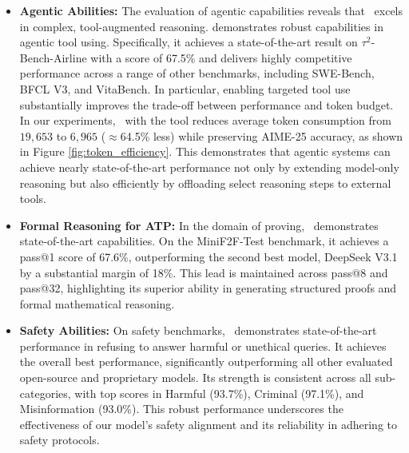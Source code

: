 \begin{itemize}
    \item\textbf{Agentic Abilities: }The evaluation of agentic capabilities reveals that~{\longcatthink} excels in complex, tool-augmented reasoning. 
    demonstrates robust capabilities in agentic tool using. Specifically, it achieves a state-of-the-art result on $\tau^2$-Bench-Airline with a score of 67.5\% and delivers highly competitive performance across a range of other benchmarks, including SWE-Bench, BFCL V3, and VitaBench. 
    In particular, enabling targeted tool use substantially improves the trade-off between performance and token budget. 
    In our experiments,~{\longcatthink} with the tool reduces average token consumption from $19,653$ to $6,965$ ($\approx$64.5\% less) while preserving AIME-25 accuracy, as shown in Figure \ref{fig:token_efficiency}. This demonstrates that agentic systems can achieve nearly state-of-the-art performance not only by extending model-only reasoning but also efficiently by offloading select reasoning steps to external tools.
    
    \item\textbf{Formal Reasoning for ATP: } 
    In the domain of proving,~{\longcatthink} demonstrates state-of-the-art capabilities. On the MiniF2F-Test benchmark, it achieves a pass@1 score of 67.6\%, outperforming the second best model, DeepSeek V3.1 by a substantial margin of 18\%. This lead is maintained across pass@8 and pass@32, highlighting its superior ability in generating structured proofs and formal mathematical reasoning.
    
    \item\textbf{Safety Abilities: }On safety benchmarks,~{\longcatthink} demonstrates state-of-the-art performance in refusing to answer harmful or unethical queries. It achieves the overall best performance, significantly outperforming all other evaluated open-source and proprietary models. Its strength is consistent across all sub-categories, with top scores in Harmful (93.7\%), Criminal (97.1\%), and Misinformation (93.0\%). This robust performance underscores the effectiveness of our model's safety alignment and its reliability in adhering to safety protocols.
\end{itemize}




